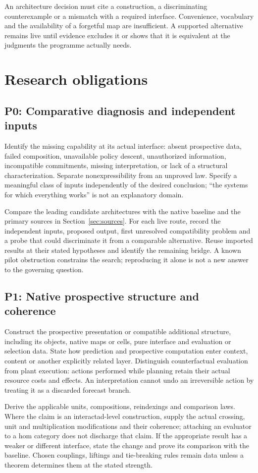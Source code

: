 \documentclass[11pt]{article}
\newcommand{\obligation}[2]{\subsection*{#1: #2}\hypertarget{#1}{}}
\begin{document}
An architecture decision must cite a construction, a discriminating counterexample or a mismatch with a required interface. Convenience, vocabulary and the availability of a forgetful map are insufficient. A supported alternative remains live until evidence excludes it or shows that it is equivalent at the judgments the programme actually needs.

\section{Research obligations}\label{sec:obligations}

\obligation{P0}{Comparative diagnosis and independent inputs}
Identify the missing capability at its actual interface: absent prospective data, failed composition, unavailable policy descent, unauthorized information, incompatible commitments, missing interpretation, or lack of a structural characterization. Separate nonexpressibility from an unproved law. Specify a meaningful class of inputs independently of the desired conclusion; ``the systems for which everything works'' is not an explanatory domain.

Compare the leading candidate architectures with the native baseline and the primary sources in Section~\ref{sec:sources}. For each live route, record the independent inputs, proposed output, first unresolved compatibility problem and a probe that could discriminate it from a comparable alternative. Reuse imported results at their stated hypotheses and identify the remaining bridge. A known pilot obstruction constrains the search; reproducing it alone is not a new answer to the governing question.

\obligation{P1}{Native prospective structure and coherence}
Construct the prospective presentation or compatible additional structure, including its objects, native maps or cells, pure interface and evaluation or selection data. State how prediction and prospective computation enter context, content or another explicitly related layer. Distinguish counterfactual evaluation from plant execution: actions performed while planning retain their actual resource costs and effects. An interpretation cannot undo an irreversible action by treating it as a discarded forecast branch.

Derive the applicable units, compositions, reindexings and comparison laws. Where the claim is an interactad-level construction, supply the actual crossing, unit and multiplication modifications and their coherence; attaching an evaluator to a hom category does not discharge that claim. If the appropriate result has a weaker or different interface, state the change and prove its comparison with the baseline. Chosen couplings, liftings and tie-breaking rules remain data unless a theorem determines them at the stated strength.
\end{document}
